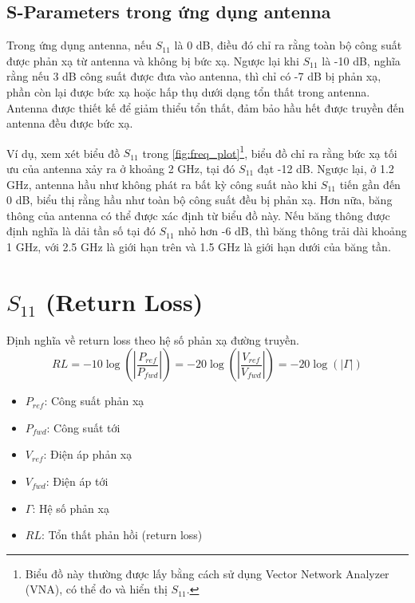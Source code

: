         \subsection{S-Parameters trong ứng dụng antenna}
            Trong ứng dụng antenna, nếu $S_{11}$ là 0 dB, điều đó chỉ ra rằng
            toàn bộ công suất được phản xạ từ antenna và không bị bức xạ.
            Ngược lại khi $S_{11}$ là -10 dB, nghĩa rằng nếu 3 dB công suất được
            đưa vào antenna, thì chỉ có -7 dB bị phản xạ, phần còn lại được bức xạ 
            hoặc hấp thụ dưới dạng tổn thất trong antenna. Antenna được thiết kế
            để giảm thiểu tổn thất, đảm bảo hầu hết được truyền đến antenna đều được bức xạ.\cite{cadence2023sparams}

            Ví dụ, xem xét biểu đồ $S_{11}$ trong \autoref{fig:freq_plot}\footnote{Biểu đồ này thường được lấy bằng cách sử dụng Vector Network Analyzer (VNA), 
            có thể đo và hiển thị $S_{11}$.}, biểu đồ chỉ ra rằng bức xạ tối ưu của antenna xảy ra ở khoảng 2 GHz, tại đó $S_{11}$ đạt -12 dB. 
            Ngược lại, ở 1.2 GHz, antenna hầu như không phát ra bất kỳ công suất nào khi $S_{11}$ tiến gần đến 0 dB, biểu thị rằng hầu như 
            toàn bộ công suất đều bị phản xạ. Hơn nữa, băng thông của antenna có thể được xác định từ biểu đồ này. Nếu băng thông được 
            định nghĩa là dải tần số tại đó $S_{11}$ nhỏ hơn -6 dB, thì băng thông trải dài khoảng 1 GHz, với 2.5 GHz là giới hạn trên và 
            1.5 GHz là giới hạn dưới của băng tần.

    

    \section{$S_{11}$ (Return Loss)}
        Định nghĩa về return loss theo hệ số phản xạ đường truyền.
        $$RL = -10\log\left(\left|\frac{P_{ref}}{P_{fwd}}\right|\right) = -20\log\left(\left|\frac{V_{ref}}{V_{fwd}}\right|\right) = -20\log\left(\left|\Gamma\right|\right)$$
        \begin{itemize}
            \item $P_{ref}$: Công suất phản xạ
            \item $P_{fwd}$: Công suất tới
            \item $V_{ref}$: Điện áp phản xạ
            \item $V_{fwd}$: Điện áp tới
            \item $\Gamma$: Hệ số phản xạ
            \item $RL$: Tổn thất phản hồi (return loss)
        \end{itemize}

